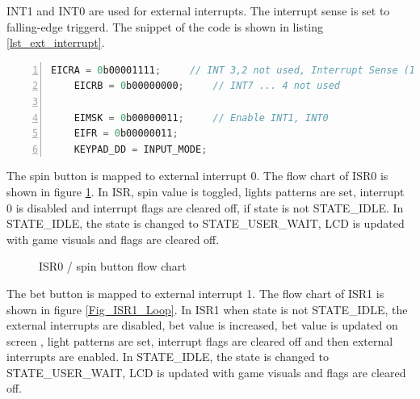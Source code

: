 \documentclass[a4paper,13pt,openany,sffamily]{memoir}
\begin{document}
\clearpage
INT1 and INT0 are used for external interrupts. The interrupt sense is set to falling-edge triggerd. The snippet of the code is shown in listing \ref{lst_ext_interrupt}.
\begin{lstlisting}[numbers=left,breaklines=true,caption={External interrupts initialization },label={lst_ext_interrupt},language=C]
	EICRA = 0b00001111;		// INT 3,2 not used, Interrupt Sense (INT1, INT0) falling-edge triggered
	EICRB = 0b00000000;		// INT7 ... 4 not used
	
	EIMSK = 0b00000011;		// Enable INT1, INT0
	EIFR = 0b00000011;
    KEYPAD_DD = INPUT_MODE;
\end{lstlisting}
The spin button is mapped to external interrupt 0.  The flow chart of ISR0 is shown in figure \ref{Fig_ISR0_Loop}. In ISR, spin value is toggled, lights patterns are set, interrupt 0 is disabled and interrupt flags are cleared off, if state is not STATE\_IDLE. In STATE\_IDLE, the state is changed to STATE\_USER\_WAIT, LCD is updated with game visuals and flags are cleared off. 


\begin{figure}[h]
\caption{ISR0 / spin button flow chart }
\label{Fig_ISR0_Loop}
\end{figure}


\clearpage

 The bet button is mapped to external interrupt 1. The flow chart of ISR1 is shown in figure \ref{Fig_ISR1_Loop}. In ISR1 when state is not STATE\_IDLE, the external interrupts are disabled, bet value is increased, bet value is updated on screen , light patterns are set, interrupt flags are cleared off and then external interrupts are enabled. In STATE\_IDLE, the state is changed to STATE\_USER\_WAIT, LCD is updated with game visuals and flags are cleared off.    
\end{document}
